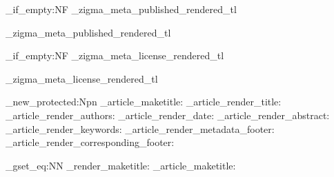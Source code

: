 {{        %
        \tl_if_empty:NF \g_zigma_meta_published_rendered_tl
          {
            \noindent
            {\small\g_zigma_meta_published_rendered_tl}
            \par
          }
        
        \tl_if_empty:NF \g_zigma_meta_license_rendered_tl
          {
            \vspace{0.3em}
            \noindent
            {\small\g_zigma_meta_license_rendered_tl}
            \par
          }
        
        \vspace{0.5em}
        \noindent
        \hrulefill
        \par
        \vspace{1em}
      }
  }


\cs_new_protected:Npn \zigma_article_maketitle:
  {
    \if@twocolumn
    \else
      \zigma_article_render_title:
      \zigma_article_render_authors:
      \zigma_article_render_date:
      \zigma_article_render_abstract:
      \zigma_article_render_keywords:
      \zigma_article_render_metadata_footer:
      \zigma_article_render_corresponding_footer:
    \fi
  }

\cs_gset_eq:NN \zigma_render_maketitle: \zigma_article_maketitle:



